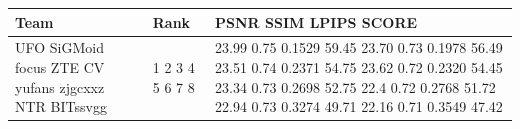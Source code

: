 \begin{tabular}{lll}
\toprule
Team & Rank & PSNR SSIM LPIPS SCORE \\
\midrule
UFO SiGMoid focus ZTE CV yufans zjgcxxz NTR BITssvgg & 1 2 3 4 5 6 7 8 & 23.99 0.75 0.1529 59.45 23.70 0.73 0.1978 56.49 23.51 0.74 0.2371 54.75 23.62 0.72 0.2320 54.45 23.34 0.73 0.2698 52.75 22.4 0.72 0.2768 51.72 22.94 0.73 0.3274 49.71 22.16 0.71 0.3549 47.42 \\
\bottomrule
\end{tabular}
